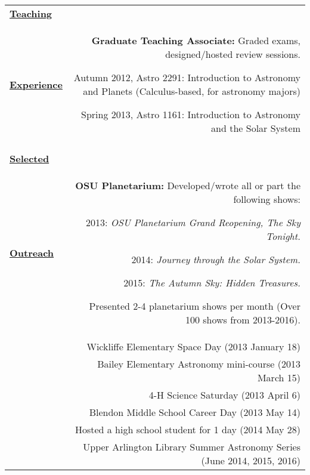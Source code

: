 \documentclass[letterpaper,11pt]{article}
\begin{document}
\begin{longtable}{LR}
\underline{\textbf{Teaching}}\\\underline{\textbf{Experience}} &  
\textbf{Graduate Teaching Associate:}  Graded exams, designed/hosted review sessions.
\begin{compactitem}
\item Autumn 2012, Astro 2291:  Introduction to Astronomy and Planets (Calculus-based, for astronomy majors)
\item Spring   2013, Astro 1161:  Introduction to Astronomy and the Solar System
\end{compactitem}\\
\\



\underline{\textbf{Selected}}\\\underline{\textbf{Outreach}} 
&\textbf{OSU Planetarium:} Developed/wrote all or part the following shows:
\begin{compactitem}
\item 2013:  \textit{OSU Planetarium Grand Reopening, The Sky Tonight.}
\item 2014:  \textit{Journey through the Solar System.}
\item 2015:  \textit{The Autumn Sky:  Hidden Treasures.}
\end{compactitem}

\noindent Presented 2-4 planetarium shows per month (Over 100 shows from 2013-2016).\\
&Wickliffe Elementary Space Day (2013 January 18)\\
&Bailey Elementary Astronomy mini-course (2013 March 15)\\
&4-H Science Saturday (2013 April 6)\\
&Blendon Middle School Career Day (2013 May 14)\\
&Hosted a high school student for 1 day (2014 May 28)\\
&Upper Arlington Library Summer Astronomy Series (June 2014, 2015, 2016)\\

\end{longtable}
\end{document}
